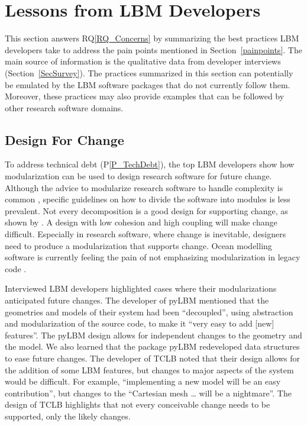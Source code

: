\documentclass[final, 3p, times, authoryear]{elsarticle}
\newcommand{\rqref}[1]{RQ\ref{#1}}
\newcommand{\ppref}[1]{P\ref{#1}}
\begin{document}
\section{Lessons from LBM Developers} \label{Sec_AddressConcerns}

This section answers \rqref{RQ_Concerns} by summarizing the best practices LBM
developers take to address the pain points mentioned in
Section~\ref{painpoints}.  The main source of information is the qualitative
data from developer interviews (Section~\ref{SecSurvey}).  The practices
summarized in this section can potentially be emulated by the LBM software
packages that do not currently follow them.  Moreover, these practices may also
provide examples that can be followed by other research software domains.

\subsection{Design For Change} \label{Sec_DesForChange}

To address technical debt (\ppref{P_TechDebt}), the top LBM developers show how
modularization can be used to design research software for future change.
Although the advice to modularize research software to handle complexity is
common \citep{WilsonEtAl2014, StewartEtAl2017, Storer2017}, specific guidelines
on how to divide the software into modules is less prevalent.  Not every
decomposition is a good design for supporting change, as shown by
\citet{Parnas1972a}.  A design with low cohesion and high coupling \citep[p.\
48]{GhezziEtAl2003} will make change difficult. Especially in research software,
where change is inevitable, designers need to produce a modularization that
supports change. Ocean modelling software is currently feeling the pain of
not emphasizing modularization in legacy code \citep{JungEtAl2022}.

Interviewed LBM developers highlighted cases where their modularizations
anticipated future changes.  The developer of pyLBM mentioned that the
geometries and models of their system had been ``decoupled'', using abstraction
and modularization of the source code, to make it ``very easy to add [new]
features''.  The pyLBM design allows for independent changes to the geometry and
the model.  We also learned that the package pyLBM redeveloped data structures
to ease future changes. The developer of TCLB noted that their design allows for
the addition of some LBM features, but changes to major aspects of the system
would be difficult. For example, ``implementing a new model will be an easy
contribution'', but changes to the ``Cartesian mesh … will be a nightmare''. The
design of TCLB highlights that not every conceivable change needs to be
supported, only the likely changes.  
\end{document}
